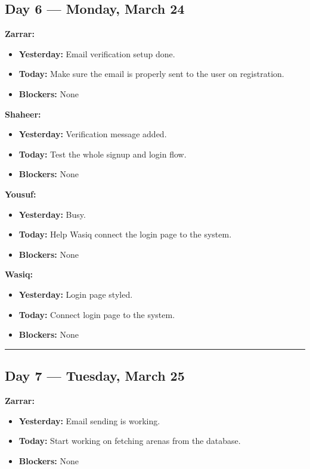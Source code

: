 \documentclass[12pt,a4paper]{article}
\begin{document}
\subsection*{Day 6 --- Monday, March 24}

\textbf{Zarrar:}
\begin{itemize}[noitemsep]
    \item \textbf{Yesterday:} Email verification setup done.
    \item \textbf{Today:} Make sure the email is properly sent to the user on registration.
    \item \textbf{Blockers:} None
\end{itemize}

\textbf{Shaheer:}
\begin{itemize}[noitemsep]
    \item \textbf{Yesterday:} Verification message added.
    \item \textbf{Today:} Test the whole signup and login flow.
    \item \textbf{Blockers:} None
\end{itemize}

\textbf{Yousuf:}
\begin{itemize}[noitemsep]
    \item \textbf{Yesterday:} Busy.
    \item \textbf{Today:} Help Wasiq connect the login page to the system.
    \item \textbf{Blockers:} None
\end{itemize}

\textbf{Wasiq:}
\begin{itemize}[noitemsep]
    \item \textbf{Yesterday:} Login page styled.
    \item \textbf{Today:} Connect login page to the system.
    \item \textbf{Blockers:} None
\end{itemize}

\vspace{1em}
\hrule
\vspace{1em}

\subsection*{Day 7 --- Tuesday, March 25}

\textbf{Zarrar:}
\begin{itemize}[noitemsep]
    \item \textbf{Yesterday:} Email sending is working.
    \item \textbf{Today:} Start working on fetching arenas from the database.
    \item \textbf{Blockers:} None
\end{itemize}
\end{document}
